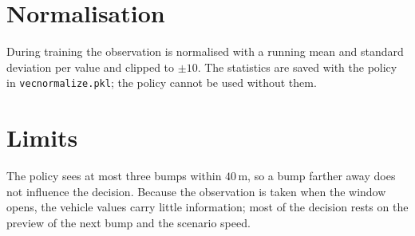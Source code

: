 \documentclass[11pt]{article}
\begin{document}
\section{Normalisation}

During training the observation is normalised with a running mean and standard deviation per value and clipped to $\pm 10$. The statistics are saved with the policy in \texttt{vecnormalize.pkl}; the policy cannot be used without them.

\section{Limits}

The policy sees at most three bumps within $40$\,m, so a bump farther away does not influence the decision. Because the observation is taken when the window opens, the vehicle values carry little information; most of the decision rests on the preview of the next bump and the scenario speed.
\end{document}
